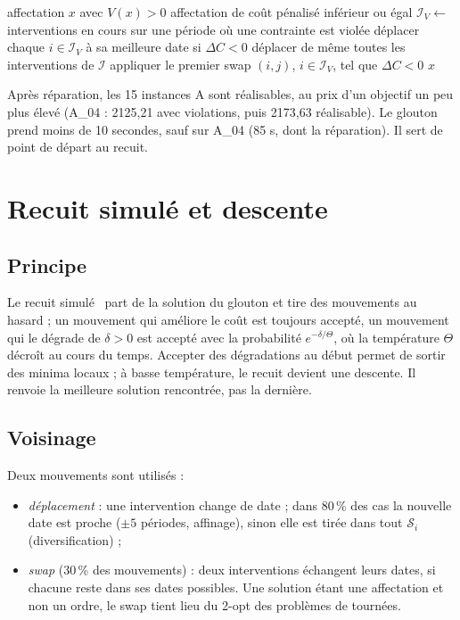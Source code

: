 \documentclass[11pt,a4paper]{report}
\newcommand{\I}{\mathcal{I}}
\newcommand{\Sd}{\mathcal{S}}
\begin{document}
\begin{algorithm}[H]
\caption{\textsc{Réparer}$(x)$}
\begin{algorithmic}[1]
\Require affectation $x$ avec $V(x) > 0$
\Ensure affectation de coût pénalisé inférieur ou égal
\Repeat
  \State $\I_V \gets$ interventions en cours sur une période où une contrainte est violée
  \State déplacer chaque $i \in \I_V$ à sa meilleure date si $\Delta C < 0$
   déplacer de même toutes les interventions de $\I$ \EndIf
   appliquer le premier swap $(i, j)$, $i \in \I_V$, tel que $\Delta C < 0$ \EndIf
{}
\State \Return $x$
\end{algorithmic}
\end{algorithm}

Après réparation, les 15 instances A sont réalisables, au prix d'un objectif un peu plus élevé
(A\_04 : 2125,21 avec violations, puis 2173,63 réalisable). Le glouton prend moins de 10 secondes,
sauf sur A\_04 (85 s, dont la réparation). Il sert de point de départ au recuit.

\chapter{Recuit simulé et descente}\label{chap:recuit}

\section{Principe}

Le recuit simulé~\cite{kirkpatrick} part de la solution du glouton et tire des mouvements au
hasard ; un mouvement qui améliore le coût est toujours accepté, un mouvement qui le dégrade de
$\delta > 0$ est accepté avec la probabilité $e^{-\delta / \Theta}$, où la température $\Theta$
décroît au cours du temps. Accepter des dégradations au début permet de sortir des minima locaux ;
à basse température, le recuit devient une descente. Il renvoie la meilleure solution rencontrée,
pas la dernière.

\section{Voisinage}

Deux mouvements sont utilisés :
\begin{itemize}
  \item \emph{déplacement} : une intervention change de date ; dans 80\,\% des cas la nouvelle date
        est proche ($\pm 5$ périodes, affinage), sinon elle est tirée dans tout $\Sd_i$ (diversification) ;
  \item \emph{swap} (30\,\% des mouvements) : deux interventions échangent leurs dates, si chacune
        reste dans ses dates possibles. Une solution étant une affectation et non un ordre, le swap
        tient lieu du 2-opt des problèmes de tournées.
\end{itemize}
\end{document}
